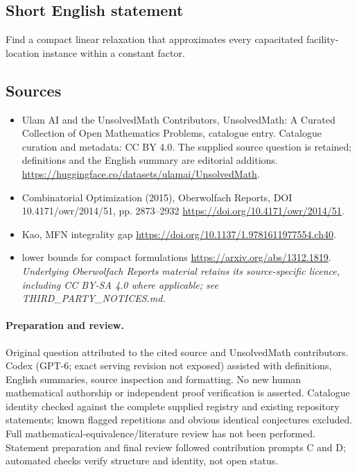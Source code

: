 \documentclass[11pt]{article}
\begin{document}
\subsection{Short English statement}
Find a compact linear relaxation that approximates every capacitated facility-location instance within a constant factor.
\subsection{Sources}
\begin{itemize}
\item[\hypertarget{source:statement:1}{S1}] Ulam AI and the UnsolvedMath Contributors, UnsolvedMath: A Curated Collection of Open Mathematics Problems, catalogue entry. Catalogue curation and metadata: CC BY 4.0. The supplied source question is retained; definitions and the English summary are editorial additions.
\url{https://huggingface.co/datasets/ulamai/UnsolvedMath}.
\item[\hypertarget{source:statement:2}{S2}] Combinatorial Optimization (2015), Oberwolfach Reports, DOI 10.4171/owr/2014/51, pp. 2873--2932
\url{https://doi.org/10.4171/owr/2014/51}.
\item[\hypertarget{source:statement:3}{S3}] Kao, MFN integrality gap
\url{https://doi.org/10.1137/1.9781611977554.ch40}.
\item[\hypertarget{source:statement:4}{S4}] lower bounds for compact formulations
\url{https://arxiv.org/abs/1312.1819}.
\textit{Underlying Oberwolfach Reports material retains its source-specific licence, including CC BY-SA 4.0 where applicable; see THIRD\_PARTY\_NOTICES.md.}
\end{itemize}
\paragraph{Preparation and review.}
Original question attributed to the cited source and UnsolvedMath contributors. Codex (GPT-6; exact serving revision not exposed) assisted with definitions, English summaries, source inspection and formatting. No new human mathematical authorship or independent proof verification is asserted. Catalogue identity checked against the complete supplied registry and existing repository statements; known flagged repetitions and obvious identical conjectures excluded. Full mathematical-equivalence/literature review has not been performed. Statement preparation and final review followed contribution prompts C and D; automated checks verify structure and identity, not open status.
\label{end:statement}
\end{document}
